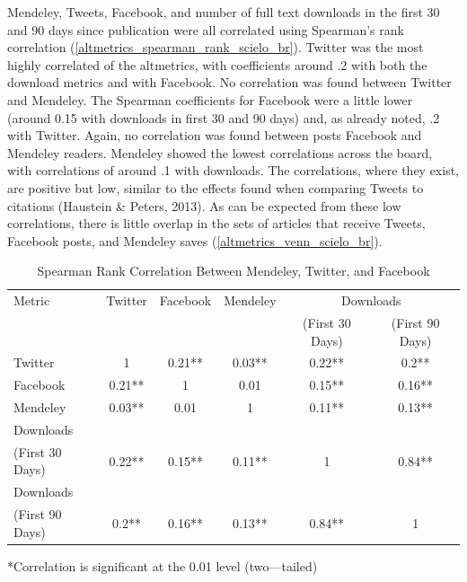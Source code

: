 Mendeley, Tweets, Facebook, and number of full text downloads in the first 30 and 90 days since publication were all correlated using Spearman's rank correlation (\autoref{altmetrics_spearman_rank_scielo_br}). Twitter was the most highly correlated of the altmetrics, with coefficients around .2 with both the download metrics and with Facebook. No correlation was found between Twitter and Mendeley. The Spearman coefficients for Facebook were a little lower (around 0.15 with downloads in first 30 and 90 days) and, as already noted, .2 with Twitter. Again, no correlation was found between posts Facebook and Mendeley readers. Mendeley showed the lowest correlations across the board, with correlations of around .1 with downloads. The correlations, where they exist, are positive but low, similar to the effects found when comparing Tweets to citations (Haustein \& Peters, 2013). As can be expected from these low correlations, there is little overlap in the sets of articles that receive Tweets, Facebook posts, and Mendeley saves (\autoref{altmetrics_venn_scielo_br}).



\begin{table}[!htbp]
\centering
\begin{threeparttable}
\caption{Spearman Rank Correlation Between Mendeley, Twitter, and Facebook} \label{altmetrics_spearman_rank_scielo_br}
\begin{tabular}{@{}lccccc@{}}
\toprule
Metric  &   Twitter &   Facebook    &   Mendeley    &   \multicolumn{2}{c}{Downloads}   \\ \cmidrule{5-6}
        &           &           &           &(First 30 Days)    &   (First 90 Days) \\ \midrule
Twitter &   1   &   0.21**  &   0.03**  &   0.22**  &   0.2**   \\
Facebook    &   0.21**  &   1   &   0.01    &   0.15**  &   0.16**  \\
Mendeley    &   0.03**  &   0.01    &   1   &   0.11**  &   0.13**  \\
Downloads   \\
(First 30 Days) &   0.22**  &   0.15**  &   0.11**  &   1   &   0.84**  \\
Downloads   \\
(First 90 Days) &   0.2**   &   0.16**  &   0.13**  &   0.84**  &   1   \\ \bottomrule
\end{tabular}
\begin{tablenotes}
\small
\item **Correlation is significant at the 0.01 level (two---tailed)
\end{tablenotes}
\end{threeparttable}
\end{table}



